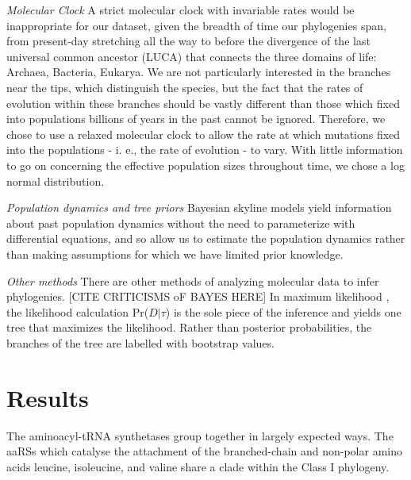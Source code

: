 \documentclass[10pt,letterpaper]{article}
\begin{document}
\textit{Molecular Clock}
A strict molecular clock with invariable rates would be inappropriate for our dataset, given the breadth of time our phylogenies span, from present-day stretching all the way to before the divergence of the last universal common ancestor (LUCA) that connects the three domains of life: Archaea, Bacteria, Eukarya. 
We are not particularly interested in the branches near the tips, which distinguish the species, but the fact that the rates of evolution within these branches should be vastly different than those which fixed into populations billions of years in the past cannot be ignored.  Therefore, we chose to use a 
relaxed molecular clock to allow the rate at which mutations fixed into the populations - i. e., the rate of evolution - to vary. \cite{RelaxedClockModelSelection}  With little information to go on concerning the effective population sizes throughout time, we chose a log normal distribution. 

\textit{Population dynamics and tree priors}
Bayesian skyline models yield information about past population dynamics without the need to parameterize with differential equations, and so allow us to estimate the population dynamics rather than making assumptions for which we have limited prior knowledge. \cite{coalSky} \cite{BDSKY}

\textit{Other methods}  There are other methods of analyzing molecular data to infer phylogenies. [CITE CRITICISMS oF BAYES HERE] In maximum likelihood \cite{Guindon}, the likelihood calculation Pr($D|\tau$) is the sole piece of the inference and yields one tree that maximizes the likelihood.  Rather than posterior probabilities, the branches of the tree are labelled with bootstrap values. \cite{HolderLewis}



\section*{Results}

The aminoacyl-tRNA synthetases group together in largely expected ways.  The aaRSs which catalyse the attachment of the branched-chain and non-polar amino acids leucine, isoleucine, and valine share a clade within the Class I phylogeny.
\end{document}

